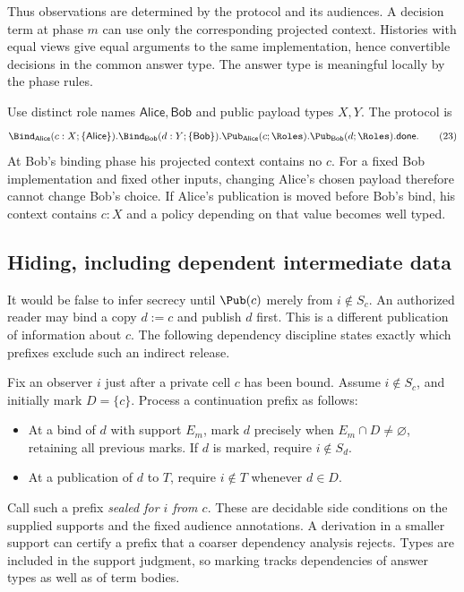 Thus observations are determined by the protocol and its audiences.
A decision term at phase $m$ can use only the corresponding projected
context. Histories with equal views give equal arguments to the same
implementation, hence convertible decisions in the common answer type.
The answer type is meaningful locally by the phase rules.

\begin{example}
Use distinct role names $\mathsf{Alice},\mathsf{Bob}$ and public payload
types $X,Y$. The protocol is
\[
 \Bind_{\mathsf{Alice}}(c:X;\{\mathsf{Alice}\}).
 \Bind_{\mathsf{Bob}}(d:Y;\{\mathsf{Bob}\}).
 \Pub_{\mathsf{Alice}}(c;\Roles).
 \Pub_{\mathsf{Bob}}(d;\Roles).
 \mathsf{done}.
 \tag{23}
\]
At Bob's binding phase his projected context contains no $c$.
For a fixed Bob implementation and fixed other inputs, changing Alice's
chosen payload therefore cannot change Bob's choice.
If Alice's publication is moved before Bob's bind, his context contains
$c:X$ and a policy depending on that value becomes well typed.
\end{example}

\subsection{Hiding, including dependent intermediate data}
\label{sec:hiding}

It would be false to infer secrecy until $\Pub(c)$ merely from
$i\notin S_c$. An authorized reader may bind a copy $d:=c$ and publish
$d$ first. This is a different publication of information about $c$.
The following dependency discipline states exactly which prefixes exclude
such an indirect release.

Fix an observer $i$ just after a private cell $c$ has been bound.
Assume $i\notin S_c$, and initially mark $D=\{c\}$.
Process a continuation prefix as follows:
\begin{itemize}
\item At a bind of $d$ with support $E_m$, mark $d$ precisely when
      $E_m\cap D\ne\varnothing$, retaining all previous marks.
      If $d$ is marked, require $i\notin S_d$.
\item At a publication of $d$ to $T$, require $i\notin T$ whenever $d\in D$.
\end{itemize}
Call such a prefix \emph{sealed for $i$ from $c$}. These are decidable
side conditions on the supplied supports and the fixed audience annotations.
A derivation in a smaller support can certify a prefix that a coarser
dependency analysis rejects. Types are included in the support judgment,
so marking tracks dependencies of answer types as well as of term bodies.

